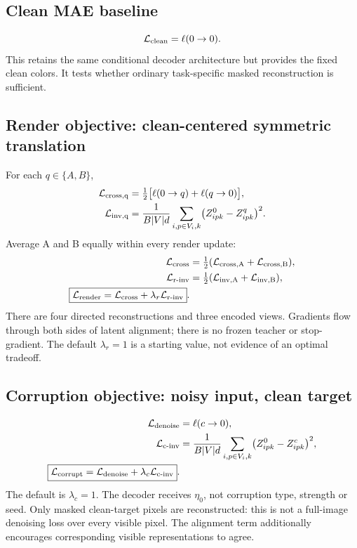 \documentclass[11pt,a4paper]{article}
\newcommand{\Lc}{\mathcal{L}}
\begin{document}
\subsection{Clean MAE baseline}
\begin{equation}
\Lc_{\rm clean}=\ell(0\to0).
\end{equation}
This retains the same conditional decoder architecture but provides the fixed clean
colors. It tests whether ordinary task-specific masked reconstruction is sufficient.

\subsection{Render objective: clean-centered symmetric translation}
For each $q\in\{A,B\}$,
\begin{align}
\Lc_{\rm cross,q}&=\tfrac12\bigl[\ell(0\to q)+\ell(q\to0)\bigr],\\
\Lc_{\rm inv,q}&=\frac{1}{B|V|d}\sum_{i,p\in V_i,k}
\bigl(Z^0_{ipk}-Z^q_{ipk}\bigr)^2.
\end{align}
Average A and B equally within every render update:
\begin{align}
\Lc_{\rm cross}&=\tfrac12(\Lc_{\rm cross,A}+\Lc_{\rm cross,B}),\\
\Lc_{\rm r\text{-}inv}&=\tfrac12(\Lc_{\rm inv,A}+\Lc_{\rm inv,B}),\\
\boxed{\Lc_{\rm render}=\Lc_{\rm cross}+\lambda_r\Lc_{\rm r\text{-}inv}}.
\end{align}
There are four directed reconstructions and three encoded views. Gradients flow
through both sides of latent alignment; there is no frozen teacher or stop-gradient.
The default $\lambda_r=1$ is a starting value, not evidence of an optimal tradeoff.

\subsection{Corruption objective: noisy input, clean target}
\begin{align}
\Lc_{\rm denoise}&=\ell(c\to0),\\
\Lc_{\rm c\text{-}inv}&=\frac{1}{B|V|d}\sum_{i,p\in V_i,k}
\bigl(Z^0_{ipk}-Z^c_{ipk}\bigr)^2,\\
\boxed{\Lc_{\rm corrupt}=\Lc_{\rm denoise}+\lambda_c\Lc_{\rm c\text{-}inv}}.
\end{align}
The default is $\lambda_c=1$. The decoder receives $\eta_0$, not corruption type,
strength or seed. Only masked clean-target pixels are reconstructed: this is not
a full-image denoising loss over every visible pixel. The alignment term additionally
encourages corresponding visible representations to agree.
\end{document}
